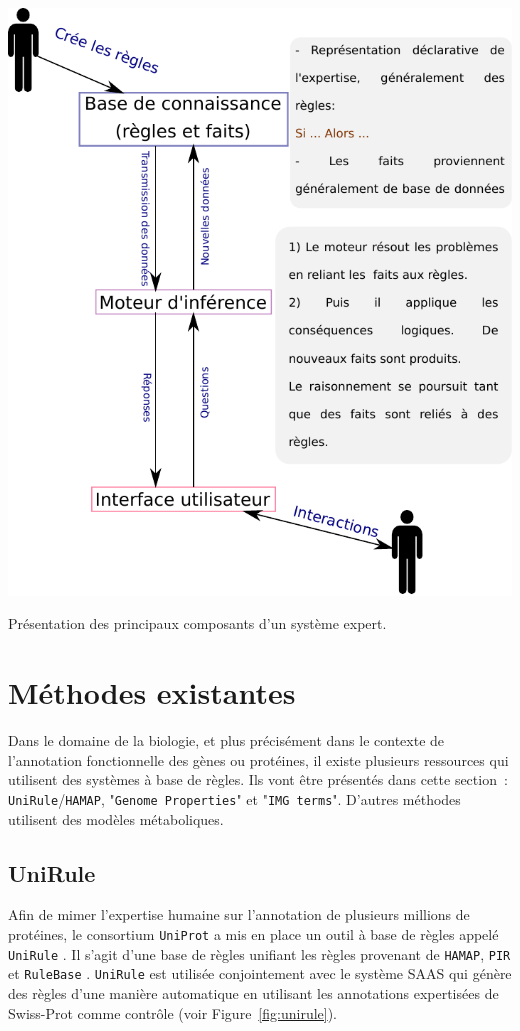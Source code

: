\begin{refsegment}
    \begin{shadedfigure}[H]
        \centering
        \includegraphics[width=\textwidth]{img/systeme_expert.pdf}
        \caption{Présentation des principaux composants d'un système expert.}
        \label{fig:systeme_expert}
    \end{shadedfigure}
    
    \section{Méthodes existantes}
    
    Dans le domaine de la biologie, et plus précisément dans le contexte de l'annotation fonctionnelle des gènes ou protéines, il existe plusieurs ressources qui utilisent des systèmes à base de règles. Ils vont être présentés dans cette section : \texttt{UniRule}/\texttt{HAMAP}, "\texttt{Genome Properties}" et "\texttt{IMG terms}". D'autres méthodes utilisent des modèles métaboliques.
    
    \subsection{UniRule}
    Afin de mimer l'expertise humaine sur l'annotation de plusieurs millions de protéines, le consortium \texttt{UniProt} a mis en place un outil à base de règles appelé \texttt{UniRule} \cite{unirule2015,bridge2010unirule}. Il s'agit d'une base de règles unifiant les règles provenant de \texttt{\gls{HAMAP}}, \texttt{\gls{PIR}} et \texttt{RuleBase} . \texttt{UniRule} est utilisée conjointement avec le système \gls{SAAS} \cite{kretschmann2001automatic,uniprot2015}  qui génère des règles d'une manière automatique en utilisant les annotations expertisées de Swiss-Prot comme contrôle (voir Figure~\cref{fig:unirule}).
    

\end{refsegment}

